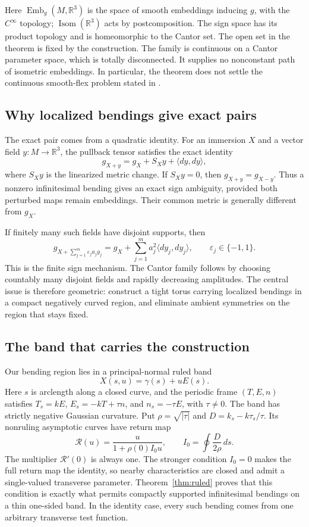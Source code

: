 \documentclass[11pt]{amsart}
\theoremstyle{definition}
\theoremstyle{remark}
\newcommand{\R}{\mathbb R}\newcommand{\Sph}{\mathbb S}
\DeclareMathOperator{\Isom}{Isom}\DeclareMathOperator{\Emb}{Emb}
\numberwithin{equation}{section}
\begin{document}
Here $\Emb_g(M,\R^3)$ is the space of smooth embeddings inducing $g$, with
the $C^\infty$ topology; $\Isom(\R^3)$ acts by postcomposition. The sign
space has its product topology and is homeomorphic to the Cantor set.
The open set in the theorem is fixed by the construction. The family
is continuous on a Cantor parameter space, which is totally disconnected.
It supplies no nonconstant path of isometric embeddings. In particular,
the theorem does not settle the continuous smooth-flex problem stated
in \cite[Problem~1.1]{GhomiProblems}.

\subsection{Why localized bendings give exact pairs}
The exact pair comes from a quadratic identity. For an immersion $X$ and a vector
field $y:M\to\R^3$, the pullback tensor satisfies the exact identity
\begin{equation}\label{eq:intro-quadratic}
 g_{X+y}=g_X+S_Xy+\langle dy,dy\rangle,
\end{equation}
where $S_Xy$ is the linearized metric change. If $S_Xy=0$, then
$g_{X+y}=g_{X-y}$. Thus a nonzero infinitesimal bending gives an exact
sign ambiguity, provided both perturbed maps remain embeddings. Their
common metric is generally different from $g_X$.

If finitely many such fields have disjoint supports, then
\[
 g_{X+\sum_{j=1}^m\varepsilon_j a_jy_j}
 =g_X+\sum_{j=1}^m a_j^2\langle dy_j,dy_j\rangle,
 \qquad \varepsilon_j\in\{-1,1\}.
\]
This is the finite sign mechanism. The Cantor family follows by choosing
countably many disjoint fields and rapidly decreasing amplitudes. The
central issue is therefore geometric: construct a tight torus carrying
localized bendings in a compact negatively curved region, and eliminate
ambient symmetries on the region that stays fixed.

\subsection{The band that carries the construction}
Our bending region lies in a principal-normal ruled band
\[
 X(s,u)=\gamma(s)+uE(s).
\]
Here $s$ is arclength along a closed curve, and the periodic frame
$(T,E,n)$ satisfies $T_s=kE$, $E_s=-kT+\tau n$, and $n_s=-\tau E$,
with $\tau\ne0$. The band has strictly negative Gaussian curvature.
Put $\rho=\sqrt{|\tau|}$ and $D=k_s-k\tau_s/\tau$. Its nonruling
asymptotic curves have return map
\begin{equation}\label{eq:intro-return}
 \mathcal R(u)=\frac{u}{1+\rho(0)I_0u},
 \qquad I_0=\oint\frac{D}{2\rho}\,ds.
\end{equation}
The multiplier $\mathcal R'(0)$ is always one. The stronger condition
$I_0=0$ makes the full return map the identity, so nearby characteristics
are closed and admit a single-valued transverse parameter.
Theorem~\ref{thm:ruled} proves that this condition is exactly what permits
compactly supported infinitesimal bendings on a thin one-sided band. In
the identity case, every such bending comes from one arbitrary transverse
test function.
\end{document}

